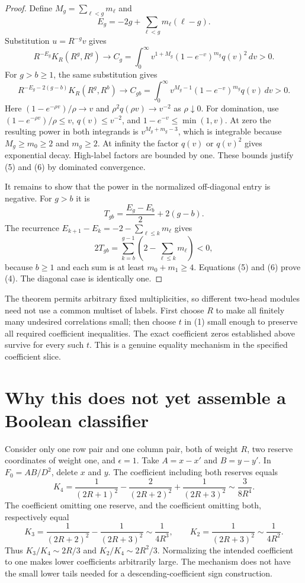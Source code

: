 \documentclass[11pt]{article}
\begin{document}
\begin{proof}
Define $M_g=\sum_{\ell<g}m_\ell$ and
\[
                  E_g=-2g+\sum_{\ell<g}m_\ell(\ell-g).
\]
Substitution $u=R^{-g}v$ gives
\[
 R^{-E_g}K_R(R^g,R^g)\longrightarrow
 C_g=\int_0^\infty
       v^{1+M_g}(1-e^{-v})^{m_g}q(v)^2\,dv>0.        \tag{5}
\]
For $g>b\ge1$, the same substitution gives
\[
 R^{-E_g-2(g-b)}K_R(R^g,R^b)\longrightarrow
 C_{gb}=\int_0^\infty
       v^{M_g-1}(1-e^{-v})^{m_g}q(v)\,dv>0.          \tag{6}
\]
Here $(1-e^{-\rho v})/\rho\to v$ and
$\rho^2q(\rho v)\to v^{-2}$ as $\rho\downarrow0$.
For domination, use $(1-e^{-\rho v})/\rho\le v$,
$q(v)\le v^{-2}$, and
$1-e^{-v}\le\min(1,v)$. At zero the resulting power in both
integrands is $v^{M_g+m_g-3}$, which is integrable because
$M_g\ge m_0\ge2$ and $m_g\ge2$. At infinity the factor $q(v)$
or $q(v)^2$ gives exponential decay. High-label factors are bounded
by one. These bounds justify (5) and (6) by dominated convergence.

It remains to show that the power in the normalized off-diagonal
entry is negative. For $g>b$ it is
\[
 T_{gb}=\frac{E_g-E_b}{2}+2(g-b).
\]
The recurrence
$E_{k+1}-E_k=-2-\sum_{\ell\le k}m_\ell$ gives
\[
 2T_{gb}=\sum_{k=b}^{g-1}
                  \left(2-\sum_{\ell\le k}m_\ell\right)<0,
\]
because $b\ge1$ and each sum is at least $m_0+m_1\ge4$.
Equations (5) and (6) prove (4). The diagonal case is identically one.
\end{proof}

The theorem permits arbitrary fixed multiplicities, so different
two-head modules need not use a common multiset of labels. First
choose $R$ to make all finitely many undesired correlations small;
then choose $t$ in (1) small enough to preserve all required coefficient
inequalities. The exact coefficient zeros established above survive
for every such $t$. This is a genuine equality mechanism in the
specified coefficient slice.

\section{Why this does not yet assemble a Boolean classifier}

Consider only one row pair and one column pair, both of weight $R$,
two reserve coordinates of weight one, and $\epsilon=1$. Take
$A=x-x'$ and $B=y-y'$. In $F_0=AB/D^2$, delete $x$ and $y$.
The coefficient including both reserves equals
\[
 K_4=\frac1{(2R+1)^2}-\frac2{(2R+2)^2}
                      +\frac1{(2R+3)^2}
                  \sim\frac3{8R^4}.
\]
The coefficient omitting one reserve, and the coefficient omitting
both, respectively equal
\[
 K_3=\frac1{(2R+2)^2}-\frac1{(2R+3)^2}
               \sim\frac1{4R^3},\qquad
 K_2=\frac1{(2R+3)^2}\sim\frac1{4R^2}.
\]
Thus $K_3/K_4\sim2R/3$ and $K_2/K_4\sim2R^2/3$.
Normalizing the intended coefficient to one makes lower coefficients
arbitrarily large. The mechanism does not have the small lower tails
needed for a descending-coefficient sign construction.
\end{document}

